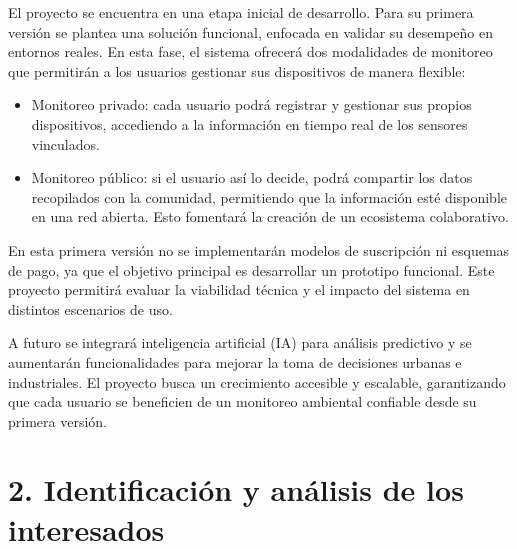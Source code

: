 \documentclass[
11pt, %
]{charter}
\begin{document}
El proyecto se encuentra en una etapa inicial de desarrollo. Para su primera versión se plantea una solución funcional, enfocada en validar su desempeño en entornos reales. En esta fase, el sistema ofrecerá dos modalidades de monitoreo que permitirán a los usuarios gestionar sus dispositivos de manera flexible:  

\begin{itemize}
    \item Monitoreo privado: cada usuario podrá registrar y gestionar sus propios dispositivos, accediendo a la información en tiempo real de los sensores vinculados.  
    \item Monitoreo público: si el usuario así lo decide, podrá compartir los datos recopilados con la comunidad, permitiendo que la información esté disponible en una red abierta. Esto fomentará la creación de un ecosistema colaborativo.  
\end{itemize}

En esta primera versión no se implementarán modelos de suscripción ni esquemas de pago, ya que el objetivo principal es desarrollar un prototipo funcional. Este proyecto permitirá evaluar la viabilidad técnica y el impacto del sistema en distintos escenarios de uso.  

A futuro se integrará inteligencia artificial (IA) para análisis predictivo y se aumentarán funcionalidades para mejorar la toma de decisiones urbanas e industriales. El proyecto busca un crecimiento accesible y escalable, garantizando que cada usuario se beneficien de un monitoreo ambiental confiable desde su primera versión.



\vspace{25px}


\section{2. Identificación y análisis de los interesados}
\label{sec:interesados}
\end{document}

